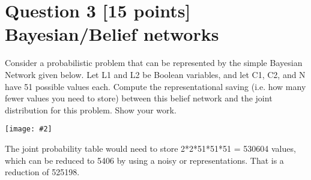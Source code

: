 \documentclass{article}
\def\ans#1{{\color{ans}#1}}
\newcommand{\centerfig}[2]{\begin{center}\texttt{[image: \#2]}\end{center}}
\begin{document}
\clearpage
\section{Question 3 [15 points] Bayesian/Belief networks}
Consider a probabilistic problem that can be represented by the simple Bayesian Network given below. Let L1 and L2 be Boolean variables, and let C1, C2, and N have 51 possible values each. Compute the representational saving (i.e. how many fewer values you need to store) between this belief network and the joint distribution for this problem. Show your work. \\
\centerfig{0.4}{../figs/fig2}
\ans{
    The joint probability table would need to store 2*2*51*51*51 = 530604 values, which 
    can be reduced to 5406 by using a noisy or representations. That is a reduction of 
    525198.
}

\clearpage
\end{document}
